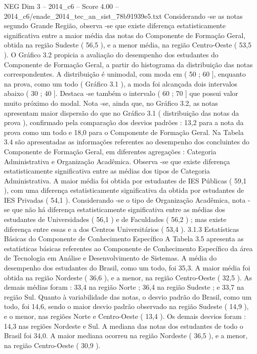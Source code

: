 \begin{textsample}{NEG Dim 3 – 2014\_c6 – Score 4.00 – 2014\_c6/enade\_2014\_tec\_an\_sist\_78b91939e5.txt}
Considerando -se as notas segundo Grande Região, observa -se que existe diferença estatisticamente significativa entre a maior média das notas do Componente de Formação Geral, obtida na região Sudeste ( 56,5 ), e a menor média, na região Centro-Oeste ( 53,5 ).
O Gráfico 3.2 propicia a avaliação do desempenho dos estudantes do Componente de Formação Geral, a partir do histograma da distribuição das notas correspondentes.
A distribuição é unimodal, com moda em ( 50 ; 60 ], enquanto na prova, como um todo ( Gráfico 3.1 ), a moda foi alcançada dois intervalos abaixo ( 30 ; 40 ].
Destaca -se também o intervalo ( 60 ; 70 ] que possui valor muito próximo do modal.
Nota -se, ainda que, no Gráfico 3.2, as notas apresentam maior dispersão do que no Gráfico 3.1 ( distribuição das notas da prova ), confirmado pela comparação dos desvios padrões : 13,2 para a nota da prova como um todo e 18,0 para o Componente de Formação Geral.
Na Tabela 3.4 são apresentadas as informações referentes ao desempenho dos concluintes do Componente de Formação Geral, em diferentes agregações : Categoria Administrativa e Organização Acadêmica.
Observa -se que existe diferença estatisticamente significativa entre as médias dos tipos de Categoria Administrativa.
A maior média foi obtida por estudantes de IES Públicas ( 59,1 ), com uma diferença estatisticamente significativa da obtida por estudantes de IES Privadas ( 54,1 ).
Considerando -se o tipo de Organização Acadêmica, nota -se que não há diferença estatisticamente significativa entre as médias dos estudantes de Universidades ( 56,1 ) e de Faculdades ( 56,2 ) ; mas existe diferença entre essas e a dos Centros Universitários ( 53,4 ). 3.1.3 Estatísticas Básicas do Componente de Conhecimento Específico A Tabela 3.5 apresenta as estatísticas básicas referentes ao Componente de Conhecimento Específico da área de Tecnologia em Análise e Desenvolvimento de Sistemas.
A média do desempenho dos estudantes do Brasil, como um todo, foi 35,3.
A maior média foi obtida na região Nordeste ( 36,6 ), e a menor, na região Centro-Oeste ( 32,5 ).
As demais médias foram : 33,4 na região Norte ; 36,4 na região Sudeste ; e 33,7 na região Sul.
Quanto à variabilidade das notas, o desvio padrão do Brasil, como um todo, foi 14,6, sendo o maior desvio padrão observado na região Sudeste ( 14,9 ), e o menor, nas regiões Norte e Centro-Oeste ( 13,4 ).
Os demais desvios foram : 14,3 nas regiões Nordeste e Sul.
A mediana das notas dos estudantes de todo o Brasil foi 34,0.
A maior mediana ocorreu na região Nordeste ( 36,5 ), e a menor, na região Centro-Oeste ( 30,9 ).

\end{textsample}
